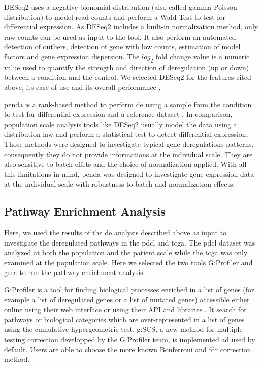 DESeq2 uses a negative bionomial distribution (also called gamma-Poisson distribution) to model read counts and perform a Wald-Test to test for differential expression.
As DESeq2 includes a built-in normalization method, only raw counts can be used as input to the tool.
It also perform an automated detection of outliers, detection of gene with low counts, estimation of model factors and gene expression dispersion.
The $log_2$ fold change value is a numeric value used to quantify the strength and direction of deregulation (up or down) between a condition and the control.
We selected DESeq2 for the features cited above, its ease of use and its overall performance \cite*{Love2014}.

\acrshort{penda} is a rank-based method to perform \acrshort{de} using a sample from the condition to test for differential expression and a reference dataset \cite*{Richard2020}.
In comparison, population scale analysis tools like DESeq2 usually model the data using a distribution law and perform a statistical test to detect differential expression.
Those methods were designed to investigate typical gene deregulations patterns, consequently they do not provide informations at the individual scale.
They are also sensitive to batch effets and the choice of normalization applied.
With all this limitations in mind, \acrshort{penda} was designed to investigate gene expression data at the individual scale with robustness to batch and normalization effects.

\subsection{Pathway Enrichment Analysis}

Here, we used the results of the \acrlong{de} analysis described above as input to investigate the deregulated pathways in the \acrshort{pdcl} and \acrshort{tcga}.
The \acrlong{pdcl} dataset was analyzed at both the population and the patient scale while the \acrshort{tcga} was only examined at the population scale.
Here we selected the two tools G:Profiler and \acrfull{gsea} to run the pathway enrichment analysis.

G:Profiler is a tool for finding biological processes enriched in a list of genes (for example a list of deregulated genes or a list of mutated genes) accessible either online using their web interface or using their API and libraries \cite*{Raudvere2019}.
It search for pathways or biological categories which are over-represented in a list of genes using the cumulative hypergeometric test.
g:SCS, a new method for multiple testing correction developped by the G:Profiler team, is implemented ad used by default.
Users are able to choose the more known Bonferroni and \acrshort{fdr} correction method.

